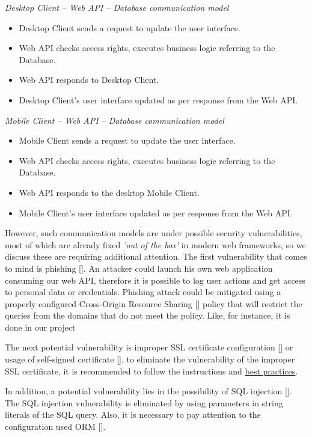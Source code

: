 \textit{Desktop Client -- Web API -- Database communication model}
\begin{itemize}
    \item Desktop Client sends a request to update the user interface.
    \item Web API checks access rights, executes business logic referring to the Database.
    \item Web API responds to Desktop Client.
    \item Desktop Client's user interface updated as per response from the Web API\@.
\end{itemize}

\textit{Mobile Client -- Web API -- Database communication model}
\begin{itemize}
    \item Mobile Client sends a request to update the user interface.
    \item Web API checks access rights, executes business logic referring to the Database.
    \item Web API responds to the desktop Mobile Client.
    \item Mobile Client's user interface updated as per response from the Web API\@.
\end{itemize}

However, such communication models are under possible security vulnerabilities, most of which are already fixed
\textit{'out of the box'} in modern web frameworks, so we discuss these are requiring additional attention.
The first vulnerability that comes to mind is phishing [\cite{dhamija2006phishing}].
An attacker could launch his own web application consuming our web API, therefore it is possible to log user actions
and get access to personal data or credentials.
Phishing attack could be mitigated using a properly configured Cross-Origin Resource Sharing [\cite{gibbinscross}]
policy that will restrict the queries from the domains that do not meet the policy.
Like, for instance, it is done in our project



The next potential vulnerability is improper SSL certificate configuration [\cite{georgiev2012most, el2012most}]
or usage of self-signed certificate [\cite{kappenberger2012true}],
to eliminate the vulnerability of the improper SSL certificate, it is recommended to follow the instructions and
\href{https://www.ssl.com/guide/ssl-best-practices/}{best practices}.

In addition, a potential vulnerability lies in the possibility of SQL injection [\cite{halfond2006classification}].
The SQL injection vulnerability is eliminated by using parameters in string literals of the SQL query.
Also, it is necessary to pay attention to the configuration used ORM [\cite{tiwari2015study}].

